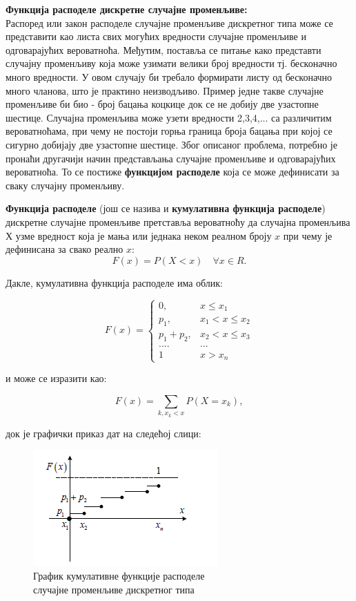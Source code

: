 \textbf{Функција расподеле дискретне случајне променљиве:}
\\

Распоред или закон расподеле случајне променљиве дискретног типа може се представити као листа свих могућих вредности случајне променљиве и одговарајућих вероватноћа. Међутим, поставља се питање како представти случајну променљиву која може узимати велики број вредности тј. бесконачно много вредности. У овом случају би требало формирати листу од бесконачно много чланова, што је практино неизводљиво. Пример једне такве случајне променљиве би био - број бацања коцкице док се не добију две узастопне шестице. Случајна променљива може узети вредности 2,3,4,... са различитим вероватноћама, при чему не постоји горња граница броја бацања при којој се сигурно добијају две узастопне шестице.
Због описаног проблема, потребно је пронаћи другачији начин представљања случајне променљиве и одговарајућих вероватноћа. То се постиже \textbf{функцијом расподеле} која се може дефинисати за сваку случајну променљиву.

\begin{de}
\textbf{Функција расподеле} (још се назива и \textbf{кумулативна функција расподеле}) дискретне случајне променљиве претставља вероватноћу да случајна променљива $Х$ узме вредност која је мања или једнака неком реалном броју $x$ при чему је дефинисана за свако реално $x$: 
$$ F(x) = P (X<x) \quad \forall x \in R. $$
\end{de}

Дакле, кумулативна функција расподеле има облик:

$$
F(x) = \left\lbrace
\begin{array}{rl}
0, & x \leq x_1 \\
p_1, & x_1 < x \leq x_2 \\
p_1 + p_2, & x_2 < x \leq x_3 \\
.... & ... \\
1 & x > x_n
\end{array}
\right.
$$

и може се изразити као:

$$
F(x) = \sum_{k,x_k<x} P(X = x_k),
$$

док је графички приказ дат на следећој слици:


\begin{figure}[H]
    \centering
\captionsetup{justification=centering}
   \includegraphics[scale=0.8]{./Slike/slika14.png} 
	\caption{График кумулативне функције расподеле \\ случајне променљиве дискретног типа} 
	\label{fig:slika13}
\end{figure}


